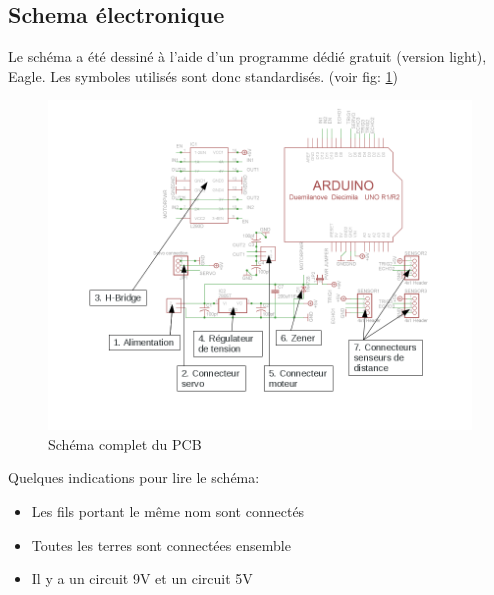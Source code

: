 \documentclass[a4paper,11pt]{report}
\begin{document}
{%

\subsection{Schema électronique}
Le schéma a été dessiné à l'aide d'un programme dédié gratuit (version light),
Eagle. Les symboles utilisés sont donc standardisés.
(voir fig: \ref{schemaChineComplet})

\begin{figure}[h!]
\centering
\includegraphics[angle=90, width=1.1\textwidth]{schema_CHI_annotated.png}
\caption{\label{schemaChineComplet}Schéma complet du PCB
}
\end{figure}

Quelques indications pour lire le schéma:

\begin{itemize}
\item Les fils portant le même nom sont connectés
\item Toutes les terres sont connectées ensemble
\item Il y a un circuit 9V et un circuit 5V
\end{itemize}

}
\end{document}
